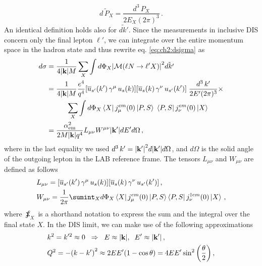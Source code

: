 \begin{equation}
    \widetilde{d\, P_X} = \frac{d^3 \, P_X}{2 E_X (2\pi)^3} \,.
\end{equation}
An identical definition holds also for $\widetilde{d k'}$.  Since the measurements in inclusive DIS concern only the final lepton $\ell'$, we can integrate over the entire momentum space in the hadron state and thus rewrite eq. \eqref{eq:ch2:dsigma} as
\begin{equation}
    \begin{split}
        d\sigma &= \frac{1}{4 \qty|\vb{k}| M} \sum_{X} \int d\Phi_X \qty| \mathcal{M} \qty( \ell N \rightarrow \ell'X ) |^2 \tilde{d k'}  \\
        & = \frac{1}{4 \qty|\vb{k}| M}  \frac{e^4}{q^4} \qty[ \overline{u}_{s'}(k') \, \gamma^{\mu}\, u_s(k)] \qty[\overline{u}_{s}(k) \,\gamma^{\nu}\, u_{s'}(k') ] \; \frac{d^3 \, k'}{2 E' (2\pi)^3} \times \\
        & \hspace{10mm} \sum_{X} \int d\Phi_X  \bra{X} j_{\mu}^{em} \qty(0) \ket{P,S} \; \bra{P,S} j_{\nu}^{em} \qty(0) \ket{X}  \\
        & = \frac{\alpha_{\textrm{em}}^2}{2 M \qty|\vb{k}| q^4} L_{\mu\nu} W^{\mu\nu} \qty|\vb{k}'| dE' d\Omega \,,
        \label{eq:ch2:dsigma2}
    \end{split}
\end{equation}
where in the last equality we used $d^3 \, k' = \qty| \vb{k}' |^2 d|\vb{k}'| d\Omega$, and $d\Omega$ is the solid angle of the outgoing lepton in the LAB reference frame. The tensors $L_{\mu\nu}$ and $W_{\mu\nu}$ are defined as follows
\begin{align}
    &L_{\mu\nu} = \qty[ \overline{u}_{s'}(k') \, \gamma^{\mu}\, u_s(k)] \qty[\overline{u}_{s}(k) \,\gamma^{\nu}\, u_{s'}(k') ] \,,
    \label{eq:ch2:lep_tens} \\
    &W_{\mu\nu} = \frac{1}{2\pi} \sumint_{X}  d\Phi_X  \bra{X} j_{\mu}^{em} (0) \ket{P,S}  \bra{P,S} j_{\nu}^{\dag em} (0) \ket{X}  \,,
    \label{eq:ch2:had_tens}
\end{align}
where $\sumint_{X}$ is a shorthand notation to express the sum and the integral over the final state $X$. In the DIS limit, we can make use of the following approximations
\begin{align}
    &k^2 = k'^2 \approx 0 \hspace{2mm} \Rightarrow \hspace{2mm} E \approx \qty| \vb{k} |, \hspace{2mm} E' \approx \qty| \vb{k'}|  \,,
    \label{eq:ch2:lep_approx}\\
    &Q^2 = - \qty(k - k')^2 \approx  2EE' \qty(1 - \cos \theta) = 4EE' \sin^2 \qty(\frac{\theta}{2}) \,,
    \label{eq:ch2:Q2_approx}
\end{align}
